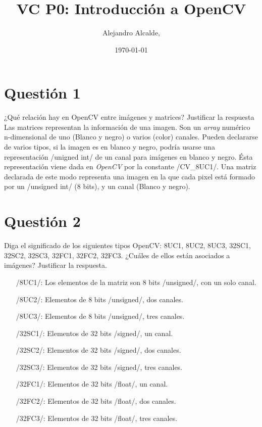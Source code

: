 \documentclass[	DIV=calc,%
							paper=a4,%
							fontsize=11pt]{scrartcl}	 					%
\title{VC P0: Introducción a OpenCV}					%
\author{Alejandro Alcalde,}											%
\date{\usefont{T1}{mdugm}{b}{it}\selectfont\today}																				%
\newcommand{\initial}[1]{%
     \lettrine[lines=3,lhang=0.3,nindent=0em]{
     				\color{DarkGoldenrod}
     				{\textsf{#1}}}{}}
\newcommand{\miit}[1]{{\usefont{T1}{mdugm}{m}{it}\selectfont #1}}
\begin{document}
\maketitle
\thispagestyle{fancy} 			%

\section{Questión 1}

\miit{¿Qué relación hay en OpenCV entre imágenes y
matrices? Justificar la respuesta}\\

Las matrices representan la información de una imagen. Son un \textit{array} numérico n-dimensional de uno (Blanco y negro) o varios (color) canales. Pueden declararse de varios tipos, si la imagen es en blanco y negro, podría usarse una representación \cppinline/unigned int/  de un canal para imágenes en blanco y negro. Ésta representación viene dada en \textit{OpenCV} por la constante \cppinline/CV_8UC1/. Una matriz declarada de este modo representa una imagen en la que cada pixel está formado por un \cppinline/unsigned int/ (8 bits), y un canal (Blanco y negro).

\section{Questión 2}

\miit{Diga el significado de los siguientes tipos OpenCV:
8UC1, 8UC2, 8UC3, 32SC1, 32SC2, 32SC3, 32FC1,
32FC2, 32FC3. ¿Cuáles de ellos están asociados a
imágenes? Justificar la respuesta.}\\

\begin{itemize}
	\item[\cppinline/8UC1/:] Los elementos de la matriz son 8 bits \cppinline/unsigned/, con un solo canal.
	\item[\cppinline/8UC2/:] Elementos de 8 bits \cppinline/unsigned/, dos canales.
	\item[\cppinline/8UC3/:] Elementos de 8 bits \cppinline/unsigned/, tres canales.
	\item[\cppinline/32SC1/:] Elementos de 32 bits \cppinline/signed/, un canal.
	\item[\cppinline/32SC2/:] Elementos de 32 bits \cppinline/signed/, dos canales.
	\item[\cppinline/32SC3/:] Elementos de 32 bits \cppinline/signed/, tres canales.
	\item[\cppinline/32FC1/:] Elementos de 32 bits \cppinline/float/, un canal.
	\item[\cppinline/32FC2/:] Elementos de 32 bits \cppinline/float/, dos canales.
	\item[\cppinline/32FC3/:] Elementos de 32 bits \cppinline/float/, tres canales.
\end{itemize}
\end{document}
